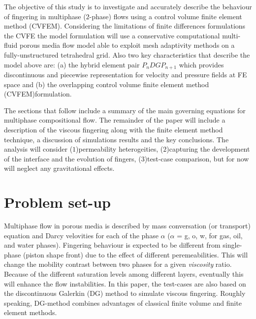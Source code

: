 \documentclass[preprint,authoryear,12pt]{elsarticle}
\begin{document}
\medskip
The objective of this study is to investigate and accurately describe the behaviour of fingering in multiphase ($2$-phase) flows using a control volume finite element method (CVFEM). Considering the limitations of finite differences formulations the CVFE the model formulation will use a conservative computational multi-fluid porous media flow model able to exploit mesh adaptivity methods on a fully-unstructured tetrahedral grid. Also two key characteristics that describe the model above are: (a) the hybrid element pair $P_{n}DGP_{n+1}$ which provides discontinuous and piecewise representation for velocity and pressure fields at FE space and (b) the overlapping control volume finite element method (CVFEM)formulation.

\medskip
The sections that follow include a summary of the main governing equations for multiphase compositional flow. The remainder of the paper will include a description of the viscous fingering along with the finite element method technique, a discussion of simulations results and the key conclusions. The analysis will consider ($1$)permeability heterogeities, ($2$)capturing the development of the interface and the evolution of fingers, ($3$)test-case comparison, but for now will neglect any gravitational effects. 



\section{Problem set-up}\label{problem_set_up}      
Multiphase flow in porous media is described by mass conversation (or transport) equation and Darcy velovities for each of the phase $\alpha$ ($\alpha$ = g, o, w, for gas, oil, and water phases).
Fingering behaviour is expected to be different from single-phase (piston shape front) due to the effect of different peremeabilities. This will change the mobility contrast between two phases for a given \textit{viscosity} ratio. Because of the  different saturation levels among different layers, eventually this will enhance the flow instabilities. In this paper, the test-cases are also based on the discontinuous Galerkin (DG) method to simulate viscous fingering. Roughly speaking, DG-method combines advantages of classical finite volume and finite element methods.  
\end{document}

